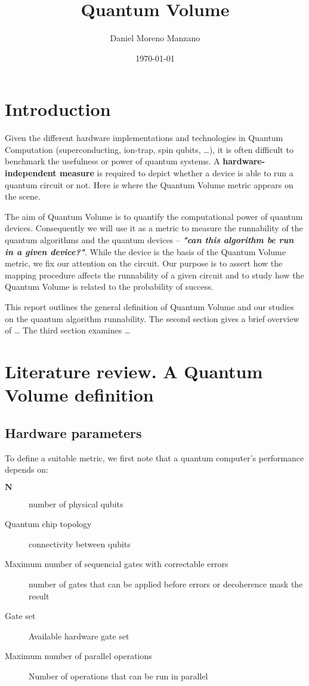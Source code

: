 \documentclass[11pt]{article}
\author{Daniel Moreno Manzano}
\date{\today}
\title{Quantum Volume}
\begin{document}
\maketitle


\section{Introduction}
\label{sec:org46abb37}

Given the different hardware implementations and technologies in Quantum Computation (superconducting, ion-trap, spin qubits, \ldots{}), it is often difficult to benchmark the usefulness or power of quantum systems. 
A \textbf{hardware-independent measure} is required to depict whether a device is able to run a quantum circuit or not.
Here is where the Quantum Volume metric appears on the scene.

The aim of Quantum Volume is to quantify the computational power of quantum devices. 
Consequently we will use it as a metric to measure the runnability of the quantum algorithms and the quantum devices -- \emph{\textbf{"can this algorithm be run in a given device?"}}.
While the device is the basis of the Quantum Volume metric, we fix our attention on the circuit.
Our purpose is to assert how the mapping procedure affects the runnability of a given circuit and to study how the Quantum Volume is related to the probability of success.

This report outlines the general definition of Quantum Volume and our studies on the quantum algorithm runnability.
The second section gives a brief overview of \ldots{}
The third section examines \ldots{}

\section{Literature review. A Quantum Volume definition}
\label{sec:org4338a3c}



\subsection{Hardware parameters}
\label{sec:org68f04dc}

To define a suitable metric, we first note that a quantum computer's performance depends on:

\begin{description}
\item[{\(\textbf{N}\)}] number of physical qubits
\item[{Quantum chip topology}] connectivity between qubits
\item[{Maximum number of sequencial gates with correctable errors}] number of gates that can be applied before errors or decoherence mask the result
\item[{Gate set}] Available hardware gate set
\item[{Maximum number of parallel operations}] Number of operations that can be run in parallel
\end{description}
\end{document}
